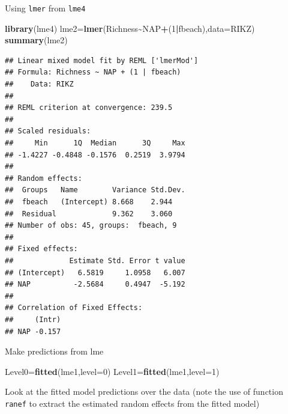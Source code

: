 \documentclass[
]{book}
\newenvironment{Shaded}{\begin{snugshade}}{\end{snugshade}}
\newcommand{\AttributeTok}[1]{\textcolor[rgb]{0.13,0.29,0.53}{#1}}
\newcommand{\DecValTok}[1]{\textcolor[rgb]{0.00,0.00,0.81}{#1}}
\newcommand{\FunctionTok}[1]{\textcolor[rgb]{0.13,0.29,0.53}{\textbf{#1}}}
\newcommand{\NormalTok}[1]{#1}
\newcommand{\OtherTok}[1]{\textcolor[rgb]{0.56,0.35,0.01}{#1}}
\newcommand{\SpecialCharTok}[1]{\textcolor[rgb]{0.81,0.36,0.00}{\textbf{#1}}}
\begin{document}
Using \texttt{lmer} from \texttt{lme4}

\begin{Shaded}
\begin{Highlighting}[]
\FunctionTok{library}\NormalTok{(lme4)}
\NormalTok{lme2}\OtherTok{=}\FunctionTok{lmer}\NormalTok{(Richness}\SpecialCharTok{\textasciitilde{}}\NormalTok{NAP}\SpecialCharTok{+}\NormalTok{(}\DecValTok{1}\SpecialCharTok{|}\NormalTok{fbeach),}\AttributeTok{data=}\NormalTok{RIKZ)}
\FunctionTok{summary}\NormalTok{(lme2)}
\end{Highlighting}
\end{Shaded}

\begin{verbatim}
## Linear mixed model fit by REML ['lmerMod']
## Formula: Richness ~ NAP + (1 | fbeach)
##    Data: RIKZ
## 
## REML criterion at convergence: 239.5
## 
## Scaled residuals: 
##     Min      1Q  Median      3Q     Max 
## -1.4227 -0.4848 -0.1576  0.2519  3.9794 
## 
## Random effects:
##  Groups   Name        Variance Std.Dev.
##  fbeach   (Intercept) 8.668    2.944   
##  Residual             9.362    3.060   
## Number of obs: 45, groups:  fbeach, 9
## 
## Fixed effects:
##             Estimate Std. Error t value
## (Intercept)   6.5819     1.0958   6.007
## NAP          -2.5684     0.4947  -5.192
## 
## Correlation of Fixed Effects:
##     (Intr)
## NAP -0.157
\end{verbatim}

Make predictions from lme

\begin{Shaded}
\begin{Highlighting}[]
\NormalTok{Level0}\OtherTok{=}\FunctionTok{fitted}\NormalTok{(lme1,}\AttributeTok{level=}\DecValTok{0}\NormalTok{)}
\NormalTok{Level1}\OtherTok{=}\FunctionTok{fitted}\NormalTok{(lme1,}\AttributeTok{level=}\DecValTok{1}\NormalTok{)}
\end{Highlighting}
\end{Shaded}

Look at the fitted model predictions over the data (note the use of function \texttt{ranef} to extract the estimated random effects from the fitted model)
\end{document}
